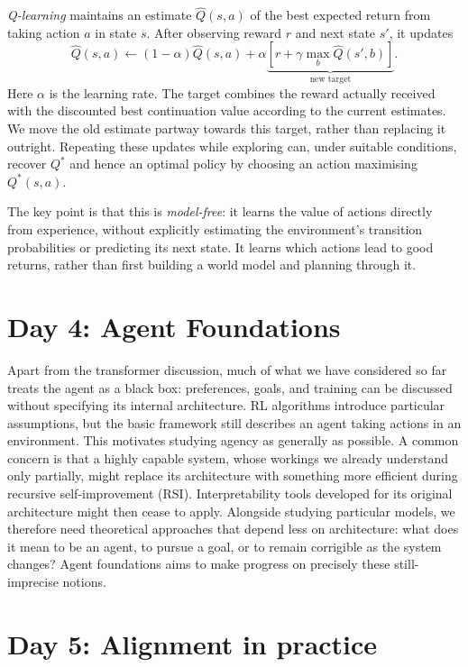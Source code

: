 \emph{Q-learning} maintains an estimate $\widehat Q(s,a)$ of the best expected return from taking action $a$ in state $s$. After observing reward $r$ and next state $s'$, it updates
\[
  \widehat Q(s,a)\leftarrow(1-\alpha)\widehat Q(s,a)
  +\alpha\underbrace{\left[r+\gamma\max_b\widehat Q(s',b)\right]}_{\text{new target}}.
\]
Here $\alpha$ is the learning rate. The target combines the reward actually received with the discounted best continuation value according to the current estimates. We move the old estimate partway towards this target, rather than replacing it outright. Repeating these updates while exploring can, under suitable conditions, recover $Q^*$ and hence an optimal policy by choosing an action maximising $Q^*(s,a)$.

The key point is that this is \emph{model-free}: it learns the value of actions directly from experience, without explicitly estimating the environment's transition probabilities or predicting its next state. It learns which actions lead to good returns, rather than first building a world model and planning through it.

\section{Day 4: Agent Foundations}

Apart from the transformer discussion, much of what we have considered so far treats the agent as a black box: preferences, goals, and training can be discussed without specifying its internal architecture. RL algorithms introduce particular assumptions, but the basic framework still describes an agent taking actions in an environment. This motivates studying agency as generally as possible. A common concern is that a highly capable system, whose workings we already understand only partially, might replace its architecture with something more efficient during recursive self-improvement (RSI). Interpretability tools developed for its original architecture might then cease to apply. Alongside studying particular models, we therefore need theoretical approaches that depend less on architecture: what does it mean to be an agent, to pursue a goal, or to remain corrigible as the system changes? Agent foundations aims to make progress on precisely these still-imprecise notions.

\section{Day 5: Alignment in practice}


